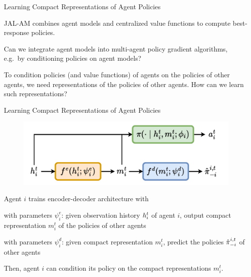 \begin{frame}[t]{Learning Compact Representations of Agent Policies}
    \blist
        \item JAL-AM combines agent models and centralized value functions to compute best-response policies.
        \item Can we integrate agent models into multi-agent policy gradient algorithms, e.g.\ by conditioning policies on agent models?
    \elist

    \pause

    \begin{problembox}
        To condition policies (and value functions) of agents on the policies of other agents, we need  representations of the policies of other agents. How can we learn such representations?
    \end{problembox}
\end{frame}

\begin{frame}[t]{Learning Compact Representations of Agent Policies}
    \begin{figure}
        \centering
        \includegraphics[width=.65\textwidth]{images/chapter_9/agent_modelling_encoder_decoder}
    \end{figure}

    Agent $i$ trains encoder-decoder architecture with
    \blist
        \item {} with parameters $\psi^e_i$: given observation history $h^t_i$ of agent $i$, output compact representation $m_i^t$ of the policies of other agents
        \item {} with parameters $\psi^d_i$: given compact representation $m_i^t$, predict the policies $\hat{\pi}_{-i}^{i,t}$ of other agents
    \elist

    \pause

    \vspace{-.5em}
    
    Then, agent $i$ can condition its policy on the compact representations $m^t_i$.
\end{frame}


